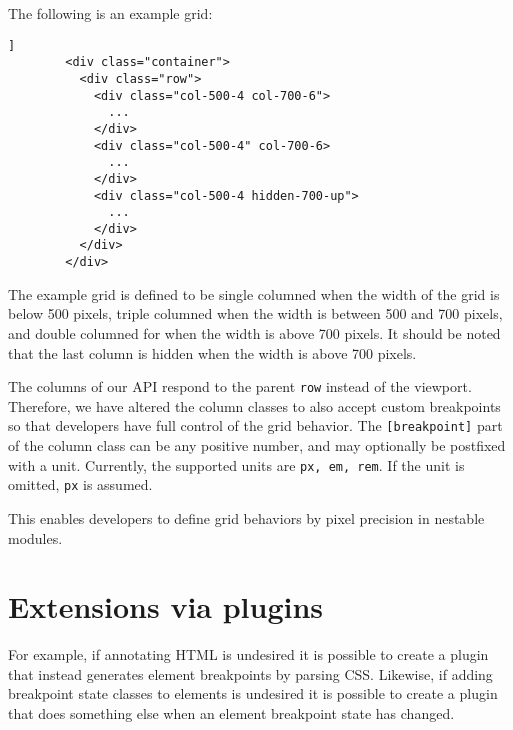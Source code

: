 \documentclass{acm_proc_article-sp}
\newcommand{\code}[1]{\texttt{#1}}
\begin{document}
      The following is an example grid:

      

      
      \begin{lstlisting}[gobble=8,caption={},captionpos=b,label={}]]
        <div class="container">
          <div class="row">
            <div class="col-500-4 col-700-6">
              ...
            </div>
            <div class="col-500-4" col-700-6>
              ...
            </div>
            <div class="col-500-4 hidden-700-up">
              ...
            </div>
          </div>
        </div>
      \end{lstlisting}

      The example grid is defined to be single columned when the width of the grid is below 500 pixels, triple columned when the width is between 500 and 700 pixels, and double columned for when the width is above 700 pixels.
      It should be noted that the last column is hidden when the width is above 700 pixels.

      The columns of our API respond to the parent \code{row} instead of the viewport.
      Therefore, we have altered the column classes to also accept custom breakpoints so that developers have full control of the grid behavior.
      The \code{[breakpoint]} part of the column class can be any positive number, and may optionally be postfixed with a unit.
      Currently, the supported units are \code{px, em, rem}.
      If the unit is omitted, \code{px} is assumed.
            
      This enables developers to define grid behaviors by pixel precision in nestable modules.

\section{Extensions via plugins}\label{sec:plugins}
  For example, if annotating HTML is undesired it is possible to create a plugin that instead generates element breakpoints by parsing CSS.
  Likewise, if adding breakpoint state classes to elements is undesired it is possible to create a plugin that does something else when an element breakpoint state has changed.
\end{document}
